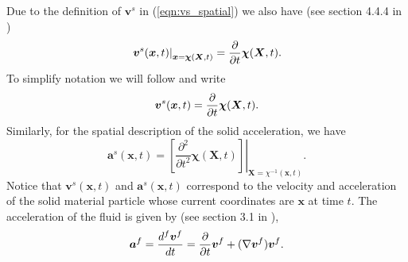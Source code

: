 %
Due to the definition of $\boldsymbol{v}^{s}$ in (\ref{eqn:vs_spatial}) we also have (see section 4.4.4 in \cite{gonzalez2008first})
\begin{equation}
 \left. \boldsymbol{v}^{s}(\boldsymbol{x},t)
\right|_{\boldsymbol{x}=\boldsymbol{\chi}(\boldsymbol{X},t)} =  \frac{\partial }{\partial t}\boldsymbol{\chi}(\boldsymbol{X},t) .
\label{eqn:spatial_velocity}
\end{equation}
To simplify notation we will follow \cite{ateshian2010finite} and write
\begin{equation}
  \boldsymbol{v}^{s}(\boldsymbol{x},t)
  =  \frac{\partial }{\partial t}\boldsymbol{\chi}(\boldsymbol{X},t) .
\label{eqn:spatial_velocity_simple}
\end{equation}
%
%
Similarly, for the spatial description of the solid acceleration, we have
\begin{equation}
 \boldsymbol{a}^{s}(\boldsymbol{x},t)= \left. \left[ \frac{\partial^{2}}{\partial t^{2}}\boldsymbol\chi(\boldsymbol{X},t) \right] \right|_{\boldsymbol{X}={\chi}^{-1}(\boldsymbol{x},t)}.
\end{equation}
Notice that $\boldsymbol{v}^{s}(\boldsymbol{x},t)$ and $\boldsymbol{a}^{s}(\boldsymbol{x},t)$ correspond to the velocity and acceleration of the solid material particle whose current coordinates are $\boldsymbol{x}$ at time $t$. 
%
The acceleration of the fluid is given by (see section 3.1 in \cite{boer2005trends}), 
\begin{equation}
\boldsymbol{a}^{f} = \frac{d^{f} \boldsymbol{v}^{f}}{d t} = \frac{\partial }{\partial t}\boldsymbol{v}^{f} + (\nabla \boldsymbol{v}^{f})\boldsymbol{v}^{f}.
 \label{eqn:fluid_acceleration}
\end{equation}
